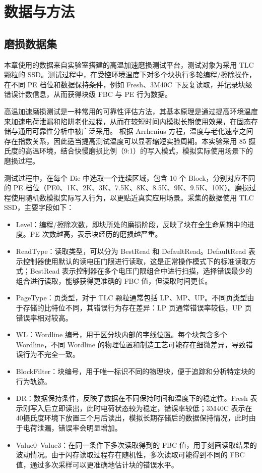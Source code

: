 \section{数据与方法}

\subsection{磨损数据集}

本章使用的数据来自实验室搭建的高温加速磨损测试平台，测试对象为采用 TLC 颗粒的 SSD。测试过程中，在受控环境温度下对多个块执行多轮编程/擦除操作，在不同 PE 档位和数据保持条件，例如 Fresh、3M40C 下反复读取，并记录块级错误计数信息，从而获得块级 FBC 与 PE 行为数据。

高温加速磨损测试是一种常用的可靠性评估方法，其基本原理是通过提高环境温度来加速电荷泄漏和陷阱老化过程，从而在较短时间内模拟长期使用效果，在固态存储与通用可靠性分析中被广泛采用\cite{sarkar2015reliability, seif2017refresh, li2017reliability, ma2019rber, raquibuzzaman2022intrablock, fitzgerald2021early, GDGX202406007}。
根据 Arrhenius 方程，温度与老化速率之间存在指数关系，因此适当提高测试温度可以显著缩短实验周期。本实验采用 85 摄氏度的高温环境，结合快慢磨损比例（9:1）的写入模式，模拟实际使用场景下的磨损过程。

测试过程中，在每个 Die 中选取一个连续区域，包含 10 个 Block，分别对应不同的 PE 档位（PE0、1K、2K、3K、7.5K、8K、8.5K、9K、9.5K、10K）。磨损过程使用随机数模拟实际写入行为，以更贴近真实应用场景。采集的数据使用 TLC SSD，主要字段如下：

\begin{itemize}
    \item Level：编程/擦除次数，即块所处的磨损阶段，反映了块在全生命周期中的进度。PE 次数越高，表示块经历的磨损越严重。
    \item ReadType：读取类型，可以分为 BestRead 和 DefaultRead。DefaultRead 表示控制器使用默认的读电压门限进行读取，这是正常操作模式下的标准读取方式；BestRead 表示控制器在多个电压门限组合中进行扫描，选择错误最少的组合进行读取，能够获得更准确的 FBC 值，但读取时间更长。
 \item PageType：页类型，对于 TLC 颗粒通常包括 LP、MP、UP。不同页类型由于存储的比特位不同，其错误行为存在差异：LP 页通常错误率较低，UP 页错误率相对较高。
    \item WL：Wordline 编号，用于区分块内部的字线位置。每个块包含多个 Wordline，不同 Wordline 的物理位置和制造工艺可能存在细微差异，导致错误行为不完全一致。
    \item BlockFilter：块编号，用于唯一标识不同的物理块，便于追踪和分析特定块的行为轨迹。
    \item DR：数据保持条件，反映了数据在不同保持时间和温度下的稳定性。Fresh 表示刚写入后立即读出，此时电荷状态较为稳定，错误率较低；3M40C 表示在 40摄氏度环境下放置三个月后读出，模拟长期存储后的数据保持情况，此时由于电荷泄漏，错误率会明显增加。
    \item Value0--Value3：在同一条件下多次读取得到的 FBC 值，用于刻画读取结果的波动情况。由于闪存读取过程存在随机性，多次读取可能得到不同的 FBC 值，通过多次采样可以更准确地估计块的错误水平。
\end{itemize}

